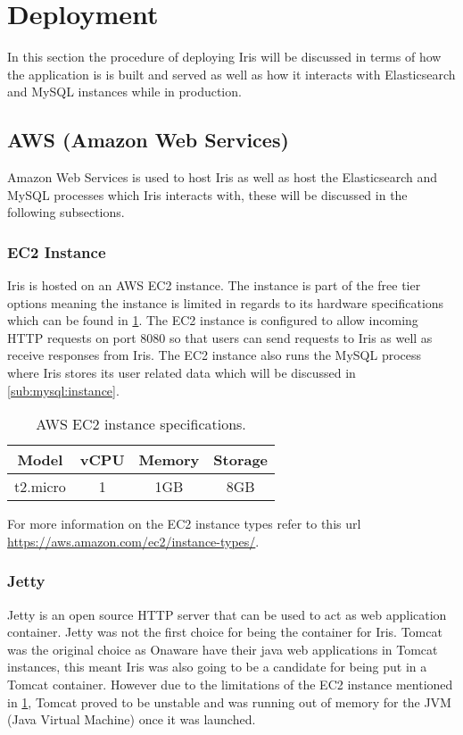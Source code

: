 \documentclass[12pt,a4paper,titlepage]{report}
\begin{document}
\section{Deployment}
In this section the procedure of deploying Iris will be discussed in terms of how the application is is built and served as well as how it interacts with Elasticsearch and MySQL instances while in production.
\subsection{AWS (Amazon Web Services)}
Amazon Web Services is used to host Iris as well as host the Elasticsearch and MySQL processes which Iris interacts with, these will be discussed in the following subsections.
\subsubsection{EC2 Instance}
\label{sub:ec2}
Iris is hosted on an AWS EC2 instance. The instance is part of the free tier options meaning the instance is limited in regards to its hardware specifications which can be found in \cref{table:ec2:specs}. The EC2 instance is configured to allow incoming HTTP requests on port 8080 so that users can send requests to Iris as well as receive responses from Iris. The EC2 instance also runs the MySQL process where Iris stores its user related data which will be discussed in \cref{sub:mysql:instance}.
\begin{table}[H]
\centering
\small
\setlength\tabcolsep{6pt}
 \begin{tabular}{|c|c|c|c|}
 \hline
 Model & vCPU & Memory & Storage\\
 \hline\hline
 t2.micro & 1 & 1GB & 8GB\\ 
 \hline
\end{tabular}
\caption{AWS EC2 instance specifications.}
\label{table:ec2:specs}
\end{table}

For more information on the EC2 instance types refer to this url \url{https://aws.amazon.com/ec2/instance-types/}.

\subsubsection{Jetty}
Jetty is an open source HTTP server that can be used to act as web application container. Jetty was not the first choice for being the container for Iris. Tomcat was the original choice as Onaware have their java web applications in Tomcat instances, this meant Iris was also going to be a candidate for being put in a Tomcat container. However due to the limitations of the EC2 instance mentioned in \cref{table:ec2:specs}, Tomcat proved to be unstable and was running out of memory for the JVM (Java Virtual Machine) once it was launched. 
\end{document}
